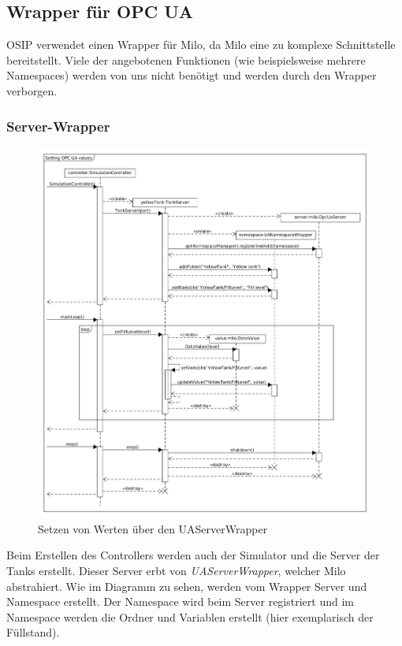 \documentclass[parskip=full]{scrartcl}
\begin{document}
\subsection{Wrapper für OPC UA}
OSIP verwendet einen Wrapper für Milo, da Milo eine zu komplexe Schnittstelle bereitstellt.
Viele der angebotenen Funktionen (wie beispielsweise mehrere Namespaces) werden von uns nicht benötigt
und werden durch den Wrapper verborgen.


\subsubsection{Server-Wrapper}
\begin{figure}[H]
  \centering
  \includegraphics[scale=0.38]{design/sequence-diagrams/sequence-set-server-value.png}
  \caption{Setzen von Werten über den UAServerWrapper}
\end{figure}
Beim Erstellen des Controllers werden auch der Simulator und die Server der Tanks erstellt.
Dieser Server erbt von \emph{UAServerWrapper}, welcher Milo abstrahiert. Wie im Diagramm zu sehen,
werden vom Wrapper Server und Namespace erstellt. Der Namespace wird beim Server registriert und
im Namespace werden die Ordner und Variablen erstellt (hier exemplarisch der Füllstand).
\end{document}
